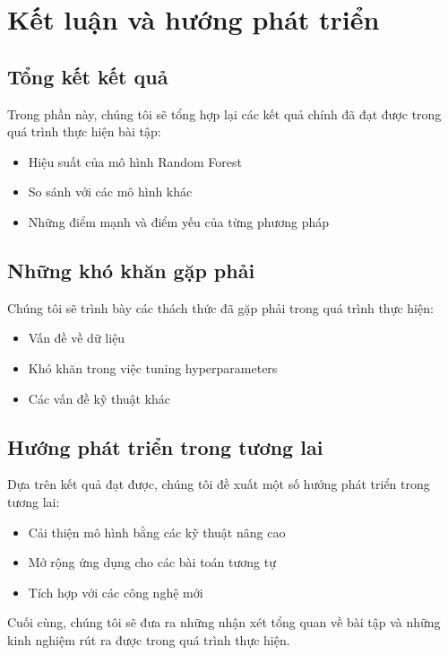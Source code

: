 \section{Kết luận và hướng phát triển}

\subsection{Tổng kết kết quả}
Trong phần này, chúng tôi sẽ tổng hợp lại các kết quả chính đã đạt được trong quá trình thực hiện bài tập:
\begin{itemize}
    \item Hiệu suất của mô hình Random Forest
    \item So sánh với các mô hình khác
    \item Những điểm mạnh và điểm yếu của từng phương pháp
\end{itemize}

\subsection{Những khó khăn gặp phải}
Chúng tôi sẽ trình bày các thách thức đã gặp phải trong quá trình thực hiện:
\begin{itemize}
    \item Vấn đề về dữ liệu
    \item Khó khăn trong việc tuning hyperparameters
    \item Các vấn đề kỹ thuật khác
\end{itemize}

\subsection{Hướng phát triển trong tương lai}
Dựa trên kết quả đạt được, chúng tôi đề xuất một số hướng phát triển trong tương lai:
\begin{itemize}
    \item Cải thiện mô hình bằng các kỹ thuật nâng cao
    \item Mở rộng ứng dụng cho các bài toán tương tự
    \item Tích hợp với các công nghệ mới
\end{itemize}

Cuối cùng, chúng tôi sẽ đưa ra những nhận xét tổng quan về bài tập và những kinh nghiệm rút ra được trong quá trình thực hiện. 